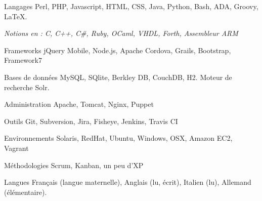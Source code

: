 
\begin{cvskills}

  \cvskill
    {Langages}
    {Perl, PHP, Javascript, HTML, CSS, Java, Python, Bash, ADA, Groovy, LaTeX.
    }

  \cvskill
    {}
    {\textit{Notions en : C, C++, C\#, Ruby, OCaml, VHDL, Forth, Assembleur ARM}}

  \cvskill
    {Frameworks}
    {jQuery Mobile, Node.js, Apache Cordova, Grails, Bootstrap, Framework7}

  \cvskill
    {Bases de données}
    {MySQL, SQlite, Berkley DB, CouchDB, H2. Moteur de recherche Solr.}

  \cvskill
    {Administration}
    {Apache, Tomcat, Nginx, Puppet}

  \cvskill
    {Outils}
    {Git, Subversion, Jira, Fisheye, Jenkins, Travis CI}

  \cvskill
    {Environnements}
    {Solaris, RedHat, Ubuntu, Windows, OSX, Amazon EC2, Vagrant}

  \cvskill
    {Méthodologies}
    {Scrum, Kanban, un peu d'XP}

  \cvskill
    {Langues}
    {Français (langue maternelle), Anglais (lu, écrit), Italien (lu), Allemand (élémentaire).}

\end{cvskills}
